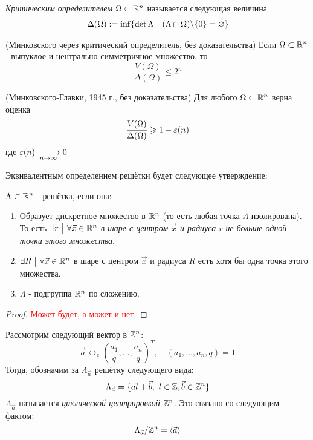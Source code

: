 \begin{definition}
	\textit{Критическим определителем} $\Omega \subset \mathbb{R}^n$ называется следующая величина
	\[
		\Delta(\Omega) := \inf \{\det \Lambda \ \big|\  (\Lambda \cap \Omega) \backslash \{0\} = \varnothing\}
	\]
\end{definition}

\begin{theorem} (Минковского через критический определитель, без доказательства)
	Если $\Omega \subset \mathbb{R}^n$ - выпуклое и центрально симметричное множество, то
	\[
		\frac{V(\Omega)}{\Delta(\Omega)} \le 2^n
	\]
\end{theorem}

\begin{theorem} (Минковского-Главки, 1945 г., без доказательства)
	Для любого $\Omega \subset \mathbb{R}^n$ верна оценка
	\[
		\frac{V(\Omega)}{\Delta(\Omega)} \geqslant 1 - \varepsilon(n)
	\]
	где $\varepsilon(n) \xrightarrow[n \to \infty]{} 0$
\end{theorem}

\begin{proposition}
	Эквивалентным определением решётки будет следующее утверждение:
	
	$\Lambda \subset \mathbb{R}^n$ - решётка, если она:
	\begin{enumerate}
		\item Образует дискретное множество в $\mathbb{R}^n$ (то есть любая точка $\Lambda$ изолирована). То есть $\exists r \ \big|\  \forall \vec{x} \in \mathbb{R}^n$ \textit{в шаре с центром $\vec{x}$ и радиуса $r$ не больше одной точки этого множества}.
		
		\item $\exists R \ \big|\  \forall \vec{x} \in \mathbb{R}^n$ в шаре с центром $\vec{x}$ и радиуса $R$ есть хотя бы одна точка этого множества.
		
		\item $\Lambda$ - подгруппа $\mathbb{R}^n$ по сложению.
	\end{enumerate}
\end{proposition}

\begin{proof}
	\textcolor{red}{Может будет, а может и нет.}
\end{proof}

\begin{definition}
	Рассмотрим следующий вектор в $\mathbb{Z}^n$:
	\[
		\vec{a} \leftrightarrow_e \left(\frac{a_1}{q}, \ldots, \frac{a_n}{q}\right)^T,\quad (a_1, \ldots, a_n, q) = 1
	\]
	Тогда, обозначим за $\Lambda_{\vec{a}}$ решётку следующего вида:
	\[
		\Lambda_{\vec{a}} = \{\vec{a}l + \vec{b},\ l \in \mathbb{Z}, \vec{b} \in \mathbb{Z}^n\}
	\]
	$\Lambda_{\vec{a}}$ называется \textit{циклической центрировкой} $\mathbb{Z}^n$. Это связано со следующим фактом:
	\[
		\Lambda_{\vec{a}} / \mathbb{Z}^n = \left\langle \vec{a} \right\rangle
	\]
\end{definition}

